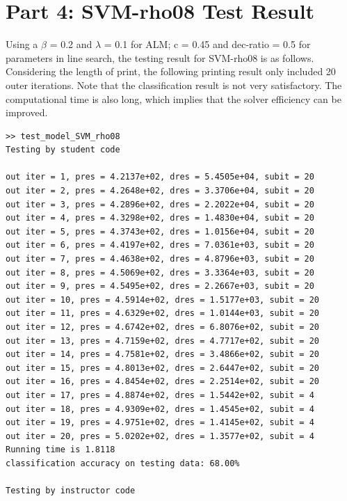 \documentclass[12pt]{article}
\begin{document}
\section*{Part 4: SVM-rho08 Test Result}
$$
$$
Using a \(\beta\) = 0.2 and \(\lambda\) = 0.1 for ALM; c = 0.45 and dec-ratio = 0.5 for parameters in line search, the testing result for SVM-rho08 is as follows. Considering the length of print, the following printing result only included 20 outer iterations. Note that the classification result is not very satisfactory. The computational time is also long, which implies that the solver efficiency can be improved.
\begin{verbatim}
>> test_model_SVM_rho08
Testing by student code

out iter = 1, pres = 4.2137e+02, dres = 5.4505e+04, subit = 20
out iter = 2, pres = 4.2648e+02, dres = 3.3706e+04, subit = 20
out iter = 3, pres = 4.2896e+02, dres = 2.2022e+04, subit = 20
out iter = 4, pres = 4.3298e+02, dres = 1.4830e+04, subit = 20
out iter = 5, pres = 4.3743e+02, dres = 1.0156e+04, subit = 20
out iter = 6, pres = 4.4197e+02, dres = 7.0361e+03, subit = 20
out iter = 7, pres = 4.4638e+02, dres = 4.8796e+03, subit = 20
out iter = 8, pres = 4.5069e+02, dres = 3.3364e+03, subit = 20
out iter = 9, pres = 4.5495e+02, dres = 2.2667e+03, subit = 20
out iter = 10, pres = 4.5914e+02, dres = 1.5177e+03, subit = 20
out iter = 11, pres = 4.6329e+02, dres = 1.0144e+03, subit = 20
out iter = 12, pres = 4.6742e+02, dres = 6.8076e+02, subit = 20
out iter = 13, pres = 4.7159e+02, dres = 4.7717e+02, subit = 20
out iter = 14, pres = 4.7581e+02, dres = 3.4866e+02, subit = 20
out iter = 15, pres = 4.8013e+02, dres = 2.6447e+02, subit = 20
out iter = 16, pres = 4.8454e+02, dres = 2.2514e+02, subit = 20
out iter = 17, pres = 4.8874e+02, dres = 1.5442e+02, subit = 4
out iter = 18, pres = 4.9309e+02, dres = 1.4545e+02, subit = 4
out iter = 19, pres = 4.9751e+02, dres = 1.4145e+02, subit = 4
out iter = 20, pres = 5.0202e+02, dres = 1.3577e+02, subit = 4
Running time is 1.8118
classification accuracy on testing data: 68.00%

Testing by instructor code


\end{verbatim}
\end{document}
